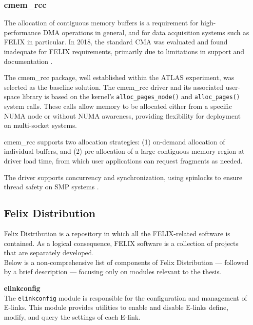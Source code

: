 \subsubsection{cmem\_rcc}

The allocation of contiguous memory buffers is a requirement for high-performance \acf{DMA} operations in general, and for data acquisition systems such as \acs{FELIX} in particular. In 2018, the standard \ac{CMA} was evaluated and found inadequate for \ac{FELIX} requirements, primarily due to limitations in support and documentation \cite{cmem-rcc}.

The cmem\_rcc \cite{cmem-rcc} package, well established within the \acs{ATLAS} experiment, was selected as the baseline solution. The cmem\_rcc driver and its associated user-space library is based on the kernel's \texttt{alloc\_pages\_node()} and \texttt{alloc\_pages()} system calls. These calls allow memory to be allocated either from a specific \ac{NUMA} node or without \ac{NUMA} awareness, providing flexibility for deployment on multi-socket systems.

cmem\_rcc supports two allocation strategies: (1) on-demand allocation of individual buffers, and (2) pre-allocation of a large contiguous memory region at driver load time, from which user applications can request fragments as needed.

The driver supports concurrency and synchronization, using spinlocks to ensure thread safety on \ac{SMP} systems \cite{cmem-rcc}.

\subsection{Felix Distribution}

Felix Distribution \cite{felix-distribution} is a repository in which all the \acs{FELIX}-related software is contained. As a logical consequence, \acs{FELIX} software is a collection of projects that are separately developed.\\
Below is a non-comprehensive list of components of Felix Distribution --- followed by a brief description --- focusing only on modules relevant to the thesis.

\textbf{elinkconfig}\\
The \texttt{elinkconfig} module is responsible for the configuration and management of \acs{E-link}s. This module provides utilities to enable and disable \acs{E-link}s define, modify, and query the settings of each \acs{E-link}.

